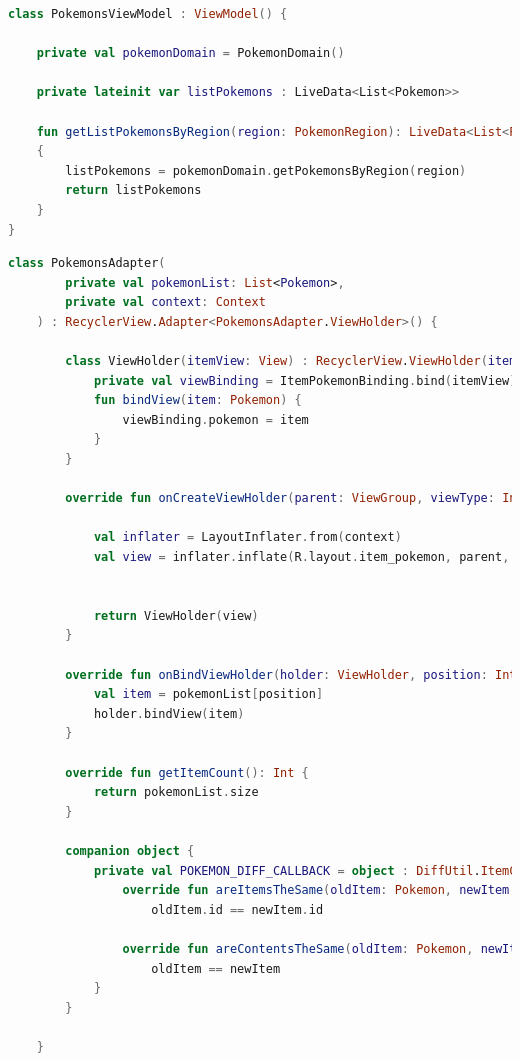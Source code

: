 \documentclass[a4paper, 12pt]{article}
\begin{document}
\begin{lstlisting}[caption={Pokemons ViewModel code.}, label={code:code_pokemons_vm}, language=Kotlin]
    class PokemonsViewModel : ViewModel() {

    private val pokemonDomain = PokemonDomain()

    private lateinit var listPokemons : LiveData<List<Pokemon>>

    fun getListPokemonsByRegion(region: PokemonRegion): LiveData<List<Pokemon>>
    {
        listPokemons = pokemonDomain.getPokemonsByRegion(region)
        return listPokemons
    }
}
\end{lstlisting}


\begin{lstlisting}[caption={Pokemons Adapter code.}, label={code:code_pokemons_adapter}, language=Kotlin]
    class PokemonsAdapter(
        private val pokemonList: List<Pokemon>,
        private val context: Context
    ) : RecyclerView.Adapter<PokemonsAdapter.ViewHolder>() {
    
        class ViewHolder(itemView: View) : RecyclerView.ViewHolder(itemView) {
            private val viewBinding = ItemPokemonBinding.bind(itemView)
            fun bindView(item: Pokemon) {
                viewBinding.pokemon = item
            }
        }
    
        override fun onCreateViewHolder(parent: ViewGroup, viewType: Int): ViewHolder {
    
            val inflater = LayoutInflater.from(context)
            val view = inflater.inflate(R.layout.item_pokemon, parent, false)
    
    
            return ViewHolder(view)
        }
    
        override fun onBindViewHolder(holder: ViewHolder, position: Int) {
            val item = pokemonList[position]
            holder.bindView(item)
        }
    
        override fun getItemCount(): Int {
            return pokemonList.size
        }
    
        companion object {
            private val POKEMON_DIFF_CALLBACK = object : DiffUtil.ItemCallback<Pokemon>() {
                override fun areItemsTheSame(oldItem: Pokemon, newItem: Pokemon): Boolean =
                    oldItem.id == newItem.id
    
                override fun areContentsTheSame(oldItem: Pokemon, newItem: Pokemon): Boolean =
                    oldItem == newItem
            }
        }
    
    }
\end{lstlisting}
\end{document}
